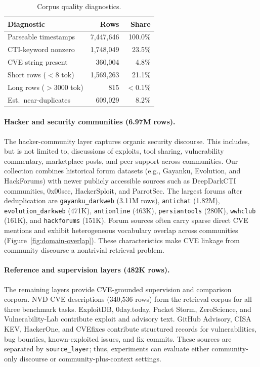 \documentclass{article}
\begin{document}
\begin{table}[t]
\vspace{-4pt}
\centering
\small
\setlength{\tabcolsep}{4pt}
\caption{Corpus quality diagnostics.}
\label{tab:quality-audit}
\begin{tabular}{lrr}
\toprule
\textbf{Diagnostic} & \textbf{Rows} & \textbf{Share} \\
\midrule
Parseable timestamps        & 7,447,646 & 100.0\% \\
CTI-keyword nonzero         & 1,748,049 &  23.5\% \\
CVE string present          &   360,004 &   4.8\% \\
Short rows ($<$8 tok)       & 1,569,263 &  21.1\% \\
Long rows ($>$3000 tok)     &       815 &  $<$0.1\% \\
Est.\ near-duplicates       &   609,029 &   8.2\% \\
\bottomrule
\end{tabular}
\vspace{-4pt}
\end{table}

\paragraph{Hacker and security communities (6.97M rows).} The hacker-community layer captures organic security discourse. This includes, but is not limited to, discussions of exploits, tool sharing, vulnerability commentary, marketplace posts, and peer support across communities. Our collection combines historical forum datasets (e.g., Gayanku, Evolution, and HackForums) with newer publicly accessible sources such as DeepDarkCTI communities, 0x00sec, HackerSploit, and ParrotSec. The largest forums after deduplication are \texttt{gayanku\_darkweb} (3.11M rows), \texttt{antichat} (1.82M), \texttt{evolution\_darkweb} (471K), \texttt{antionline} (463K), \texttt{persiantools} (280K), \texttt{wwhclub} (161K), and \texttt{hackforums} (151K). Forum sources often carry sparse direct CVE mentions and exhibit heterogeneous vocabulary overlap across communities (Figure~\ref{fig:domain-overlap}). These characteristics make CVE linkage from community discourse a nontrivial retrieval problem.

\paragraph{Reference and supervision layers (482K rows).}
The remaining layers provide CVE-grounded supervision and comparison corpora. NVD CVE descriptions (340,536 rows) form the retrieval corpus for all three benchmark tasks. ExploitDB, 0day.today, Packet Storm, ZeroScience, and Vulnerability-Lab contribute exploit and advisory text. GitHub Advisory, CISA KEV, HackerOne, and CVEfixes contribute structured records for vulnerabilities, bug bounties, known-exploited issues, and fix commits. These sources are separated by \texttt{source\_layer}; thus, experiments can evaluate either community-only discourse or community-plus-context settings.
\end{document}
